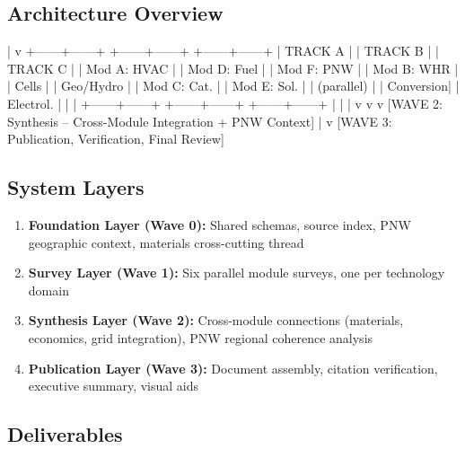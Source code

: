 \documentclass[11pt,letterpaper]{article}
\begin{document}
\subsection{Architecture Overview}

\begin{asciibox}
         |
         v
  +------+------+  +------+------+  +------+------+
  | TRACK A     |  | TRACK B     |  | TRACK C     |
  | Mod A: HVAC |  | Mod D: Fuel |  | Mod F: PNW  |
  | Mod B: WHR  |  |   Cells     |  |   Geo/Hydro |
  | Mod C: Cat. |  | Mod E: Sol. |  | (parallel)  |
  |   Conversion|  |  Electrol.  |  |             |
  +------+------+  +------+------+  +------+------+
         |                |                |
         v                v                v
  [WAVE 2: Synthesis -- Cross-Module Integration + PNW Context]
         |
         v
  [WAVE 3: Publication, Verification, Final Review]
\end{asciibox}

\subsection{System Layers}
\begin{enumerate}
  \item \textbf{Foundation Layer (Wave 0):} Shared schemas, source index, PNW geographic context, materials cross-cutting thread
  \item \textbf{Survey Layer (Wave 1):} Six parallel module surveys, one per technology domain
  \item \textbf{Synthesis Layer (Wave 2):} Cross-module connections (materials, economics, grid integration), PNW regional coherence analysis
  \item \textbf{Publication Layer (Wave 3):} Document assembly, citation verification, executive summary, visual aids
\end{enumerate}

\subsection{Deliverables}
\end{document}

